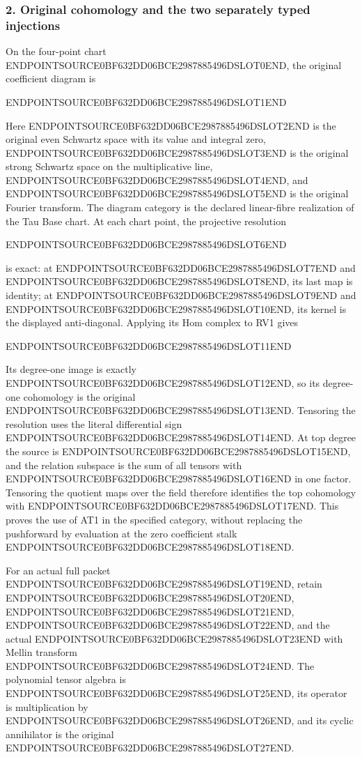 \subsubsection{2. Original cohomology and the two separately typed injections}\label{endpoint-determinant_review--original-cohomology-and-the-two-separately-typed-injections}

On the four-point chart ENDPOINTSOURCE0BF632DD06BCE2987885496DSLOT0END, the original coefficient diagram is

ENDPOINTSOURCE0BF632DD06BCE2987885496DSLOT1END

Here ENDPOINTSOURCE0BF632DD06BCE2987885496DSLOT2END is the original even Schwartz space with its value and integral zero, ENDPOINTSOURCE0BF632DD06BCE2987885496DSLOT3END is the original strong Schwartz space on the multiplicative line, ENDPOINTSOURCE0BF632DD06BCE2987885496DSLOT4END, and ENDPOINTSOURCE0BF632DD06BCE2987885496DSLOT5END is the original Fourier transform. The diagram category is the declared linear-fibre realization of the Tau Base chart. At each chart point, the projective resolution

ENDPOINTSOURCE0BF632DD06BCE2987885496DSLOT6END

is exact: at ENDPOINTSOURCE0BF632DD06BCE2987885496DSLOT7END and ENDPOINTSOURCE0BF632DD06BCE2987885496DSLOT8END, its last map is identity; at ENDPOINTSOURCE0BF632DD06BCE2987885496DSLOT9END and ENDPOINTSOURCE0BF632DD06BCE2987885496DSLOT10END, its kernel is the displayed anti-diagonal. Applying its Hom complex to RV1 gives

ENDPOINTSOURCE0BF632DD06BCE2987885496DSLOT11END

Its degree-one image is exactly ENDPOINTSOURCE0BF632DD06BCE2987885496DSLOT12END, so its degree-one cohomology is the original ENDPOINTSOURCE0BF632DD06BCE2987885496DSLOT13END. Tensoring the resolution uses the literal differential sign ENDPOINTSOURCE0BF632DD06BCE2987885496DSLOT14END. At top degree the source is ENDPOINTSOURCE0BF632DD06BCE2987885496DSLOT15END, and the relation subspace is the sum of all tensors with ENDPOINTSOURCE0BF632DD06BCE2987885496DSLOT16END in one factor. Tensoring the quotient maps over the field therefore identifies the top cohomology with ENDPOINTSOURCE0BF632DD06BCE2987885496DSLOT17END. This proves the use of AT1 in the specified category, without replacing the pushforward by evaluation at the zero coefficient stalk ENDPOINTSOURCE0BF632DD06BCE2987885496DSLOT18END.

For an actual full packet ENDPOINTSOURCE0BF632DD06BCE2987885496DSLOT19END, retain ENDPOINTSOURCE0BF632DD06BCE2987885496DSLOT20END, ENDPOINTSOURCE0BF632DD06BCE2987885496DSLOT21END, ENDPOINTSOURCE0BF632DD06BCE2987885496DSLOT22END, and the actual ENDPOINTSOURCE0BF632DD06BCE2987885496DSLOT23END with Mellin transform ENDPOINTSOURCE0BF632DD06BCE2987885496DSLOT24END. The polynomial tensor algebra is ENDPOINTSOURCE0BF632DD06BCE2987885496DSLOT25END, its operator is multiplication by ENDPOINTSOURCE0BF632DD06BCE2987885496DSLOT26END, and its cyclic annihilator is the original ENDPOINTSOURCE0BF632DD06BCE2987885496DSLOT27END.

